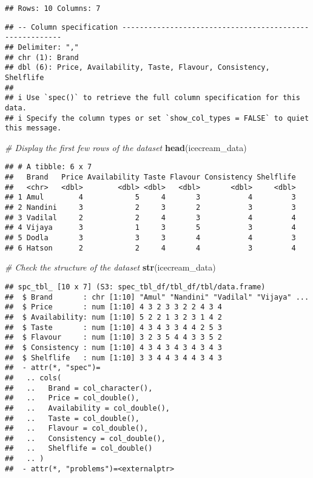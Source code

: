 \documentclass[
]{article}
\newenvironment{Shaded}{\begin{snugshade}}{\end{snugshade}}
\newcommand{\CommentTok}[1]{\textcolor[rgb]{0.56,0.35,0.01}{\textit{#1}}}
\newcommand{\FunctionTok}[1]{\textcolor[rgb]{0.13,0.29,0.53}{\textbf{#1}}}
\newcommand{\NormalTok}[1]{#1}
\begin{document}
\begin{verbatim}
## Rows: 10 Columns: 7
\end{verbatim}

\begin{verbatim}
## -- Column specification --------------------------------------------------------
## Delimiter: ","
## chr (1): Brand
## dbl (6): Price, Availability, Taste, Flavour, Consistency, Shelflife
## 
## i Use `spec()` to retrieve the full column specification for this data.
## i Specify the column types or set `show_col_types = FALSE` to quiet this message.
\end{verbatim}

\begin{Shaded}
\begin{Highlighting}[]
\CommentTok{\# Display the first few rows of the dataset}
\FunctionTok{head}\NormalTok{(icecream\_data)}
\end{Highlighting}
\end{Shaded}

\begin{verbatim}
## # A tibble: 6 x 7
##   Brand   Price Availability Taste Flavour Consistency Shelflife
##   <chr>   <dbl>        <dbl> <dbl>   <dbl>       <dbl>     <dbl>
## 1 Amul        4            5     4       3           4         3
## 2 Nandini     3            2     3       2           3         3
## 3 Vadilal     2            2     4       3           4         4
## 4 Vijaya      3            1     3       5           3         4
## 5 Dodla       3            3     3       4           4         3
## 6 Hatson      2            2     4       4           3         4
\end{verbatim}

\begin{Shaded}
\begin{Highlighting}[]
\CommentTok{\# Check the structure of the dataset}
\FunctionTok{str}\NormalTok{(icecream\_data)}
\end{Highlighting}
\end{Shaded}

\begin{verbatim}
## spc_tbl_ [10 x 7] (S3: spec_tbl_df/tbl_df/tbl/data.frame)
##  $ Brand       : chr [1:10] "Amul" "Nandini" "Vadilal" "Vijaya" ...
##  $ Price       : num [1:10] 4 3 2 3 3 2 2 4 3 4
##  $ Availability: num [1:10] 5 2 2 1 3 2 3 1 4 2
##  $ Taste       : num [1:10] 4 3 4 3 3 4 4 2 5 3
##  $ Flavour     : num [1:10] 3 2 3 5 4 4 3 3 5 2
##  $ Consistency : num [1:10] 4 3 4 3 4 3 4 3 4 3
##  $ Shelflife   : num [1:10] 3 3 4 4 3 4 4 3 4 3
##  - attr(*, "spec")=
##   .. cols(
##   ..   Brand = col_character(),
##   ..   Price = col_double(),
##   ..   Availability = col_double(),
##   ..   Taste = col_double(),
##   ..   Flavour = col_double(),
##   ..   Consistency = col_double(),
##   ..   Shelflife = col_double()
##   .. )
##  - attr(*, "problems")=<externalptr>
\end{verbatim}
\end{document}
